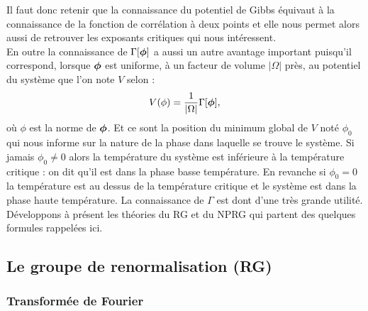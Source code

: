 \documentclass[10pt]{article}
\begin{document}
\begin{multicols}{2}
Il faut donc retenir que la connaissance du potentiel de Gibbs équivaut à la connaissance de la fonction de corrélation à deux points et elle nous permet alors aussi de retrouver les exposants critiques qui nous intéressent. \\

En outre la connaissance de $\Gamma[\boldsymbol{ \phi}]$ a aussi un autre avantage important puisqu'il correspond, lorsque $\boldsymbol{ \phi}$ est uniforme, à un facteur de volume $|\Omega|$ près, au potentiel du système que l'on note $V$ selon :
\begin{equation}
	V(\phi) = \frac{1}{|\Omega|}\Gamma[\boldsymbol{ \phi}],
\end{equation}
où $\phi$ est la norme de $\boldsymbol{ \phi}$. Et ce sont la position du minimum global de $V$ noté $\phi_0$ qui nous informe sur la nature de la phase dans laquelle se trouve le système. Si jamais $\phi_0 \neq 0$ alors la température du système est inférieure à la température critique : on dit qu'il est dans la phase basse température. En revanche si  $\phi_0 = 0$ la température est au dessus de la température critique et le système est dans la phase haute température. La connaissance de $\Gamma$ est dont d'une très grande utilité.\\

Développons à présent les théories du RG et du NPRG qui partent des quelques formules rappelées ici. 



\vspace*{11pt}
\subsection{Le groupe de renormalisation (RG)}


\subsubsection{Transformée de Fourier}


\end{multicols}
\end{document}
